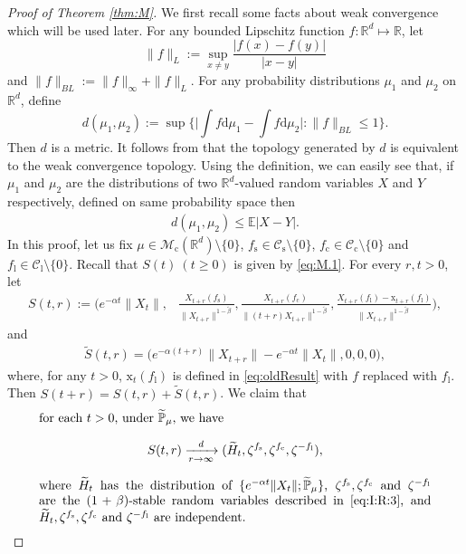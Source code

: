 \documentclass[12pt,a4paper]{amsart}
\theoremstyle{plain}
\theoremstyle{definition}
\numberwithin{equation}{section}
\begin{document}
\begin{proof}[Proof of Theorem \ref{thm:M}]
 We first recall some facts about weak convergence which will be used later. 
	For any bounded Lipschitz function $f:\mathbb R^d\mapsto \mathbb R$, let
\[
	\|f\|_L
	:=\sup_{x\neq y}\frac{|f(x)-f(y)|}{|x-y|}
\]
	and $\|f\|_{BL}:= \|f\|_{\infty}+\|f\|_L. $
For any probability distributions $\mu_1$ and $\mu_2$ on $\mathbb R^d$, define
\[
  d(\mu_1,\mu_2)
  :=\sup\Big\{\Big|\int f \mathrm d\mu_1-\int f \mathrm d\mu_2\Big|:\|f\|_{BL}\leq 1\Big\}.
\]
Then $d$ is a metric. It follows from \cite[Theorem 11.3.3]{Dudley2002} that the topology generated by $d$ is equivalent to the weak convergence topology.
Using the definition, we can easily see that, if $\mu_1$ and $\mu_2$ are the distributions of two $\mathbb R^d $-valued random variables $X$ and $Y$ respectively,
defined on same probability space then
\begin{align}\label{ineq: distribution control}
  d(\mu_1,\mu_2) \leq \mathbb E|X-Y|.
\end{align}
In this proof, let us fix $\mu\in \mathcal M_\mathrm c(\mathbb R^d)\setminus \{0\}$, $f_\mathrm s\in \mathcal C_\mathrm s\setminus\{0\}$, $f_\mathrm c \in \mathcal C_\mathrm c\setminus\{0\}$ and $f_\mathrm l \in \mathcal C_\mathrm l\setminus\{0\}$.
Recall that $S(t)~(t\geq 0)$ is given by \eqref{eq:M.1}.
For every $r,t> 0$, let
\begin{align}
 S(t,r):=\Big(e^{-\alpha t}\|X_t\|,& \frac{X_{t+r}(f_\mathrm s)}{\|X_{t+r}\|^{1-\tilde{\beta}}}, \frac{X_{t+r}(f_\mathrm c)}{\|(t+r)X_{t+r}\|^{1-\tilde{\beta}}}, \frac{X_{t+r}(f_\mathrm l)-\mathrm x_{t+r}(f_\mathrm l) }{\|X_{t+r}\|^{1-\tilde{\beta}}}\Big),
\end{align}
and
\begin{align}
\widetilde{S}(t,r)= \Big(e^{-\alpha (t+r)}\|X_{t+r}\|-e^{-\alpha t}\|X_t\|,0,0,0\Big),
\end{align}
where, for any $t>0$, $\mathrm x_t(f_\mathrm l)$ is defined in \eqref{eq:oldResult} with $f$ replaced with $f_\mathrm l$.
Then $S(t+r)=S(t,r)+\widetilde{S}(t,r)$.
We claim that
\begin{equation}\label{eq:M.3}
\begin{minipage}{0.9\textwidth}
	for each $t> 0$, under $\widetilde{\mathbb P}_{\mu}$, we have
	\[
	S(t,r)\xrightarrow[r\rightarrow \infty]{d} (\widetilde H_t,\zeta^{f_\mathrm s},\zeta^{f_\mathrm c},\zeta^{-f_\mathrm l}),
	\]
	where $\widetilde H_t$ has the distribution of $\{e^{-\alpha t} \|X_t\|; \widetilde {\mathbb P}_\mu\}$,
	$\zeta^{f_\mathrm s},\zeta^{f_\mathrm c}$ and $\zeta^{-f_\mathrm l}$ are the $(1+\beta)$-stable random variables described in \eqref{eq:I:R:3}, 
	and $\widetilde H_t,\zeta^{f_\mathrm s},\zeta^{f_\mathrm c}$ and $\zeta^{-f_\mathrm l}$ are independent.
\end{minipage}
\end{equation}


\end{proof}
\end{document}
